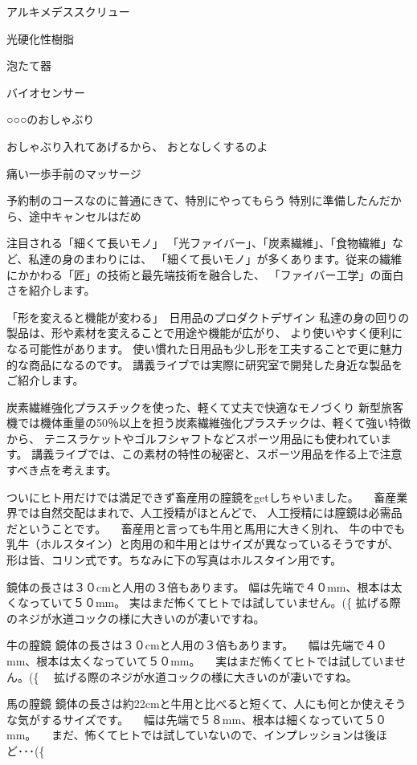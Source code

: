 アルキメデススクリュー

光硬化性樹脂

泡たて器

バイオセンサー

○○○のおしゃぶり

おしゃぶり入れてあげるから、
おとなしくするのよ

痛い一歩手前のマッサージ

予約制のコースなのに普通にきて、特別にやってもらう
特別に準備したんだから、途中キャンセルはだめ


注目される「細くて長いモノ」
「光ファイバー」、「炭素繊維」、「食物繊維」など、私達の身のまわりには、
「細くて長いモノ」が多くあります。従来の繊維にかかわる「匠」の技術と最先端技術を融合した、
「ファイバー工学」の面白さを紹介します。

「形を変えると機能が変わる」　日用品のプロダクトデザイン
私達の身の回りの製品は、形や素材を変えることで用途や機能が広がり、
より使いやすく便利になる可能性があります。
使い慣れた日用品も少し形を工夫することで更に魅力的な商品になるのです。
講義ライブでは実際に研究室で開発した身近な製品をご紹介します。

炭素繊維強化プラスチックを使った、軽くて丈夫で快適なモノづくり
新型旅客機では機体重量の50％以上を担う炭素繊維強化プラスチックは、軽くて強い特徴から、
テニスラケットやゴルフシャフトなどスポーツ用品にも使われています。
講義ライブでは、この素材の特性の秘密と、スポーツ用品を作る上で注意すべき点を考えます。

ついにヒト用だけでは満足できず畜産用の膣鏡をgetしちゃいました。 
　畜産業界では自然交配はまれで、人工授精がほとんどで、
人工授精には膣鏡は必需品だということです。 
　畜産用と言っても牛用と馬用に大きく別れ、
牛の中でも乳牛（ホルスタイン）と肉用の和牛用とはサイズが異なっているそうですが、
形は皆、コリン式です。ちなみに下の写真はホルスタイン用です。 

鏡体の長さは３０cmと人用の３倍もあります。
幅は先端で４０mm、根本は太くなっていて５０mm。
実はまだ怖くてヒトでは試していません。(^^; 
拡げる際のネジが水道コックの様に大きいのが凄いですね。


牛の膣鏡
鏡体の長さは３０cmと人用の３倍もあります。
　幅は先端で４０mm、根本は太くなっていて５０mm。
　実はまだ怖くてヒトでは試していません。(^^; 
　拡げる際のネジが水道コックの様に大きいのが凄いですね。

馬の膣鏡
鏡体の長さは約22cmと牛用と比べると短くて、人にも何とか使えそうな気がするサイズです。
　幅は先端で５８mm、根本は細くなっていて５０mm。
　まだ、怖くてヒトでは試していないので、インプレッションは後ほど･･･(^^; 

